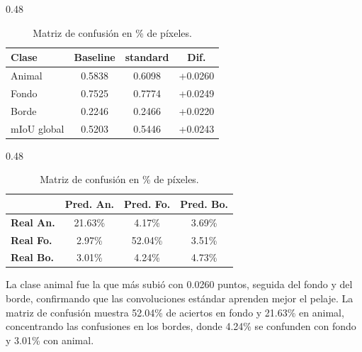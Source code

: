 \documentclass[10pt,letterpaper]{article}
\begin{document}
\begin{table}[h]
    \centering
    \small
    \caption{Comparación de IoU por clase y matriz de confusión de standard\_conv.}
    \label{tab_analisis_tablas}
    \begin{subtable}{0.48\textwidth}
        \centering
        \caption{IoU por clase frente al baseline.}
        \begin{tabular}{lccc}
            \toprule
            \textbf{Clase} & \textbf{Baseline} & \textbf{standard} & \textbf{Dif.} \\
            \midrule
            Animal         & 0.5838            & 0.6098            & +0.0260       \\
            Fondo          & 0.7525            & 0.7774            & +0.0249       \\
            Borde          & 0.2246            & 0.2466            & +0.0220       \\
            \midrule
            mIoU global    & 0.5203            & 0.5446            & +0.0243       \\
            \bottomrule
        \end{tabular}
    \end{subtable}
    \hfill
    \begin{subtable}{0.48\textwidth}
        \centering
        \caption{Matriz de confusión en \% de píxeles.}
        \begin{tabular}{lccc}
            \toprule
                              & \textbf{Pred. An.} & \textbf{Pred. Fo.} & \textbf{Pred. Bo.} \\
            \midrule
            \textbf{Real An.} & 21.63\%            & 4.17\%             & 3.69\%             \\
            \textbf{Real Fo.} & 2.97\%             & 52.04\%            & 3.51\%             \\
            \textbf{Real Bo.} & 3.01\%             & 4.24\%             & 4.73\%             \\
            \bottomrule
        \end{tabular}
    \end{subtable}
\end{table}

La clase animal fue la que más subió con 0.0260 puntos, seguida del fondo y del borde, confirmando que las convoluciones estándar aprenden mejor el pelaje. La matriz de confusión muestra 52.04\% de aciertos en fondo y 21.63\% en animal, concentrando las confusiones en los bordes, donde 4.24\% se confunden con fondo y 3.01\% con animal.
\end{document}
